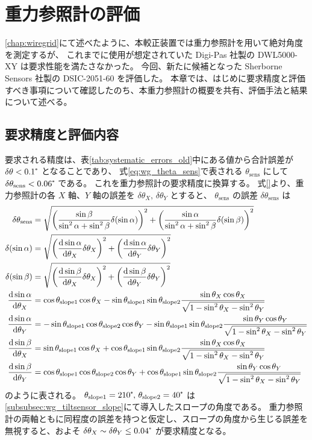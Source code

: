 \documentclass[../../main.tex]{subfiles}
\begin{document}
\chapter{重力参照計の評価}
\label{chap:tiltsensor}
\ref{chap:wiregrid}にて述べたように、本較正装置では重力参照計を用いて絶対角度を測定するが、
これまでに使用が想定されていた Digi-Pas 社製の DWL5000-XY は要求性能を満たさなかった。
今回、新たに候補となった Sherborne Sensors 社製の DSIC-2051-60 を評価した。
本章では、はじめに要求精度と評価すべき事項について確認したのち、本重力参照計の概要を共有、評価手法と結果について述べる。
\section{要求精度と評価内容}
要求される精度は、表\ref{tab:systematic_errors_old}中にある値から合計誤差が $\delta\theta < 0.1\tcdegree$ となることであり、
式\eqref{eq:wg_theta_sens}で表される $\theta_{\mathrm{sens}}$ にして $\delta\theta_{\mathrm{sens}}<0.06\tcdegree$ である。
これを重力参照計の要求精度に換算する。
式\eqref{}より、重力参照計の各 $X$ 軸、$Y$ 軸の誤差を $\delta\theta_{X},\,\delta\theta_{Y}$ とすると、
$\theta_{\mathrm{sens}}$ の誤差 $\delta\theta_{\mathrm{sens}}$ は
\begin{align}
    \delta\theta_{\mathrm{sens}} &= 
        \sqrt{\qty(\dfrac{\sin\beta}{\sin^2\alpha+\sin^2\beta} \delta\qty(\sin\alpha))^2 + \qty(\dfrac{\sin\alpha}{\sin^2\alpha+\sin^2\beta} \delta\qty(\sin\beta))^2}\\ 
    \delta\qty(\sin\alpha) &= \sqrt{\qty(\dv{\sin\alpha}{\theta_X}\delta\theta_X)^2+\qty(\dv{\sin\alpha}{\theta_Y}\delta\theta_Y)^2}\\
    \delta\qty(\sin\beta) &= \sqrt{\qty(\dv{\sin\beta}{\theta_X}\delta\theta_X)^2+\qty(\dv{\sin\beta}{\theta_Y}\delta\theta_Y)^2} \\
    \dv{\sin\alpha}{\theta_X} &= \cos\theta_{\mathrm{slope}1}\cos\theta_X - \sin\theta_{\mathrm{slope}1}\sin\theta_{\mathrm{slope}2}\dfrac{\sin\theta_X\cos\theta_X}{\sqrt{1-\sin^2\theta_X-\sin^2\theta_Y}} \\
    \dv{\sin\alpha}{\theta_Y} &= -\sin\theta_{\mathrm{slope}1}\cos\theta_{\mathrm{slope}2}\cos\theta_Y - \sin\theta_{\mathrm{slope}1}\sin\theta_{\mathrm{slope}2}\dfrac{\sin\theta_Y\cos\theta_Y}{\sqrt{1-\sin^2\theta_X-\sin^2\theta_Y}} \\
    \dv{\sin\beta}{\theta_X} &= \sin\theta_{\mathrm{slope}1}\cos\theta_X + \cos\theta_{\mathrm{slope}1}\sin\theta_{\mathrm{slope}2}\dfrac{\sin\theta_X\cos\theta_X}{\sqrt{1-\sin^2\theta_X-\sin^2\theta_Y}} \\
    \dv{\sin\beta}{\theta_Y} &= \cos\theta_{\mathrm{slope}1}\cos\theta_{\mathrm{slope}2}\cos\theta_Y + \cos\theta_{\mathrm{slope}1}\sin\theta_{\mathrm{slope}2}\dfrac{\sin\theta_Y\cos\theta_Y}{\sqrt{1-\sin^2\theta_X-\sin^2\theta_Y}}
\end{align}
のように表される。
$\theta_{\mathrm{slope}1}=210\tcdegree,\,\theta_{\mathrm{slope}2}=40\tcdegree$ は\ref{subsubsec:wg_tiltsensor_slope}にて導入したスロープの角度である。
重力参照計の両軸ともに同程度の誤差を持つと仮定し、スロープの角度から生じる誤差を無視すると、およそ $\delta\theta_{X} \sim \delta\theta_{Y} \leq 0.04\tcdegree$ が要求精度となる。
\end{document}
